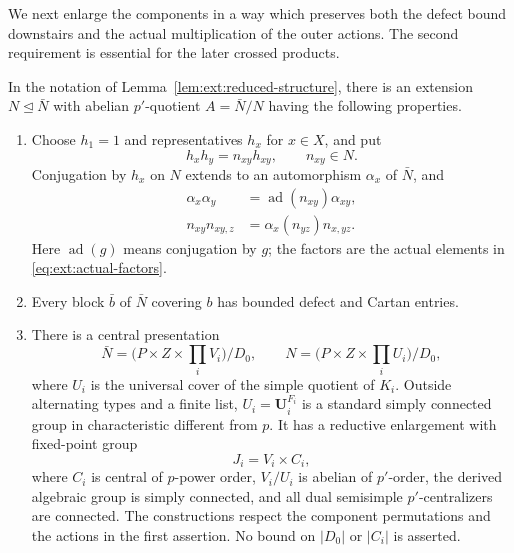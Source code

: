 We next enlarge the components in a way which preserves both the
defect bound downstairs and the actual multiplication of the outer
actions.  The second requirement is essential for the later crossed
products.

\begin{lemma}
\label{lem:ext:partial-extension}
In the notation of Lemma~\ref{lem:ext:reduced-structure}, there is an
extension $N\trianglelefteq\bar N$ with abelian $p'$-quotient
$A=\bar N/N$ having the following properties.
\begin{enumerate}
\item Choose $h_1=1$ and representatives $h_x$ for $x\in X$, and put
\begin{equation}\label{eq:ext:actual-factors}
 h_xh_y=n_{xy}h_{xy},\qquad n_{xy}\in N.
\end{equation}
Conjugation by $h_x$ on $N$ extends to an automorphism $\alpha_x$ of
$\bar N$, and
\begin{align}
 \alpha_x\alpha_y&=\operatorname{ad}(n_{xy})\alpha_{xy},
 \label{eq:ext:action-law}\\
 n_{xy}n_{xy,z}&=\alpha_x(n_{yz})n_{x,yz}.
 \label{eq:ext:factor-law}
\end{align}
Here $\operatorname{ad}(g)$ means conjugation by $g$; the factors are
the actual elements in \eqref{eq:ext:actual-factors}.
\item Every block $\bar b$ of $\bar N$ covering $b$ has bounded defect
and Cartan entries.
\item There is a central presentation
\[
 \bar N=\bigl(P\times Z\times\prod_i V_i\bigr)/D_0,
 \qquad
 N=\bigl(P\times Z\times\prod_i U_i\bigr)/D_0,
\]
where $U_i$ is the universal cover of the simple quotient of $K_i$.
Outside alternating types and a finite list, $U_i=\mathbf U_i^{F_i}$
is a standard simply connected group in characteristic different
from $p$.  It has a reductive enlargement with fixed-point group
\[
 J_i=V_i\times C_i,
\]
where $C_i$ is central of $p$-power order, $V_i/U_i$ is abelian of
$p'$-order, the derived algebraic group is simply connected, and
all dual semisimple $p'$-centralizers are connected.  The constructions
respect the component permutations and the actions in the first
assertion.  No bound on $|D_0|$ or $|C_i|$ is asserted.
\end{enumerate}
\end{lemma}

